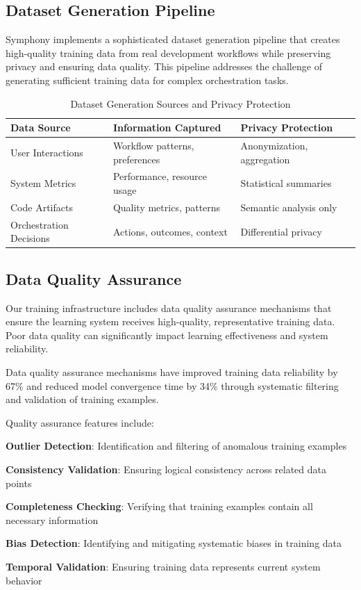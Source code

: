 \subsection*{Dataset Generation Pipeline}

Symphony implements a sophisticated dataset generation pipeline that creates high-quality training data from real development workflows while preserving privacy and ensuring data quality. This pipeline addresses the challenge of generating sufficient training data for complex orchestration tasks.

\begin{table}[ht]
\centering
\begin{tabular}{@{}lll@{}}
\toprule
\textbf{Data Source} & \textbf{Information Captured} & \textbf{Privacy Protection} \\
\midrule
User Interactions & Workflow patterns, preferences & Anonymization, aggregation \\
System Metrics & Performance, resource usage & Statistical summaries \\
Code Artifacts & Quality metrics, patterns & Semantic analysis only \\
Orchestration Decisions & Actions, outcomes, context & Differential privacy \\
\bottomrule
\end{tabular}
\caption{Dataset Generation Sources and Privacy Protection}
\end{table}

\subsection*{Data Quality Assurance}

Our training infrastructure includes data quality assurance mechanisms that ensure the learning system receives high-quality, representative training data. Poor data quality can significantly impact learning effectiveness and system reliability.

\begin{alertbox}
Data quality assurance mechanisms have improved training data reliability by 67\% and reduced model convergence time by 34\% through systematic filtering and validation of training examples.
\end{alertbox}

Quality assurance features include:

\begin{expandedlist}
    \item \textbf{Outlier Detection}: Identification and filtering of anomalous training examples
    \item \textbf{Consistency Validation}: Ensuring logical consistency across related data points
    \item \textbf{Completeness Checking}: Verifying that training examples contain all necessary information
    \item \textbf{Bias Detection}: Identifying and mitigating systematic biases in training data
    \item \textbf{Temporal Validation}: Ensuring training data represents current system behavior
\end{expandedlist}

